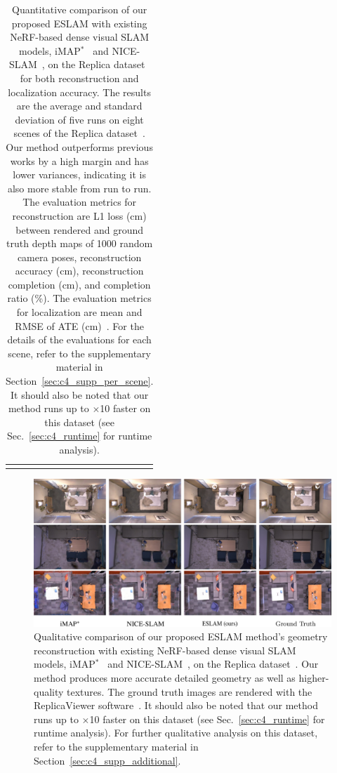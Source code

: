 \begin{table}[t]
\begin{center}
\begin{tabular}{l|cccc}
            \Xhline{2\arrayrulewidth}
        \end{tabular}
    \end{center}
    \caption{Quantitative comparison of our proposed ESLAM with existing NeRF-based dense visual SLAM models, iMAP$^{*}$~\citep{sucar2021imap} and NICE-SLAM~\citep{zhu2022nice}, on the Replica dataset~\citep{replica19arxiv} for both reconstruction and localization accuracy. The results are the average and standard deviation of five runs on eight scenes of the Replica dataset~\citep{replica19arxiv}. Our method outperforms previous works by a high margin and has lower variances, indicating it is also more stable from run to run. The evaluation metrics for reconstruction are L1 loss (cm) between rendered and ground truth depth maps of 1000 random camera poses, reconstruction accuracy (cm), reconstruction completion (cm), and completion ratio (\%). The evaluation metrics for localization are mean and RMSE of ATE (cm)~\citep{sturm2012benchmark}. For the details of the evaluations for each scene, refer to the supplementary material in Section~\ref{sec:c4_supp_per_scene}. It should also be noted that our method runs up to $\times$10 faster on this dataset (see Sec.~\ref{sec:c4_runtime} for runtime analysis).}
    \label{table:quantitative_replica}
\end{table}

\begin{figure}[t]
    \begin{center}
        \includegraphics[width=1.0\linewidth]{images/chapter4/figures/Fig3.jpg}
    \end{center}
    \caption{Qualitative comparison of our proposed ESLAM method's geometry reconstruction with existing NeRF-based dense visual SLAM models, iMAP$^*$~\citep{sucar2021imap} and NICE-SLAM~\citep{zhu2022nice}, on the Replica dataset~\citep{replica19arxiv}. Our method produces more accurate detailed geometry as well as higher-quality textures. The ground truth images are rendered with the ReplicaViewer software~\citep{replica19arxiv}. It should also be noted that our method runs up to $\times$10 faster on this dataset (see Sec.~\ref{sec:c4_runtime} for runtime analysis). For further qualitative analysis on this dataset, refer to the supplementary material in Section~\ref{sec:c4_supp_additional}.}
    \label{fig:c4_qualitative_replica}
\end{figure}

